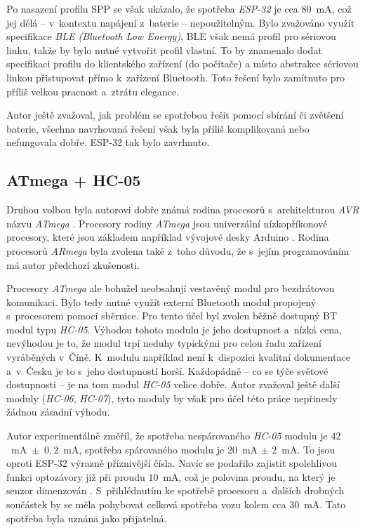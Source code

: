 Po nasazení profilu \gls{SPP} se však ukázalo, že spotřeba \textit{ESP-32} je
cca $80$~mA, což jej dělá -- v~kontextu napájení z~baterie -- nepoužitelným.
Bylo zvažováno využít specifikace \textit{BLE (Bluetooth Low Energy)}, BLE však
nemá profil pro sériovou linku, takže by bylo nutné vytvořit profil vlastní. To
by znamenalo dodat specifikaci profilu do klientského zařízení (do počítače) a
místo abstrakce sériovou linkou přistupovat přímo k~zařízení Bluetooth.  Toto
řešení bylo zamítnuto pro příliš velkou pracnost a~ztrátu elegance.

Autor ještě zvažoval, jak problém se spotřebou řešit pomocí sbírání či
zvětšení baterie, všechna navrhovaná řešení však byla příliš komplikovaná nebo
nefungovala dobře. ESP-32 tak bylo zavrhnuto.

\subsection{ATmega + HC-05}
\label{subsec:wsm-atmega}

Druhou volbou byla autorovi dobře známá rodina procesorů s~architekturou
\textit{AVR} názvu \textit{ATmega} \cite{avr}. Procesory rodiny \textit{ATmega}
jsou univerzální nízkopříkonové procesory, které jsou základem například
vývojové desky Arduino \cite{arduino}. Rodina procesorů \textit{ARmega} byla
zvolena také z~toho důvodu, že s~jejím programováním má autor předchozí
zkušenosti.

Procesory \textit{ATmega} ale bohužel neobsahují vestavěný modul pro
bezdrátovou komunikaci. Bylo tedy nutné využít externí Bluetooth modul
propojený s~procesorem pomocí sběrnice. Pro tento účel byl zvolen
běžně dostupný \gls{BT} modul typu \textit{HC-05}. Výhodou tohoto modulu je jeho
dostupnost a~nízká cena, nevýhodou je to, že modul trpí neduhy typickými pro
celou řadu zařízení vyráběných v~Číně. K~modulu například není k~dispozici
kvalitní dokumentace a~v~Česku je to s~jeho dostupností horší. Každopádně
-- co se týče světové dostupnosti -- je na tom modul \textit{HC-05} velice
dobře. Autor zvažoval ještě další moduly (\textit{HC-06}, \textit{HC-07}), tyto
moduly by však pro účel této práce nepřinesly žádnou zásadní výhodu.

Autor experimentálně změřil, že spotřeba nespárovaného \textit{HC-05} modulu je
$42$~mA~$\pm$~$0,2$~mA, spotřeba spárovaného modulu je $20$~mA $\pm$ $2$~mA. To
jsou oproti ESP-32 výrazně příznivější čísla. Navíc se podařilo zajistit
spolehlivou funkci optozávory již při proudu $10$~mA, což je polovina proudu,
na který je senzor dimenzován \cite{gp1s23:datasheet}. S~přihlédnutím ke
spotřebě procesoru a~dalších drobných součástek by se měla pohybovat celková
spotřeba vozu kolem cca $30$~mA. Tato spotřeba byla uznána jako přijatelná.

